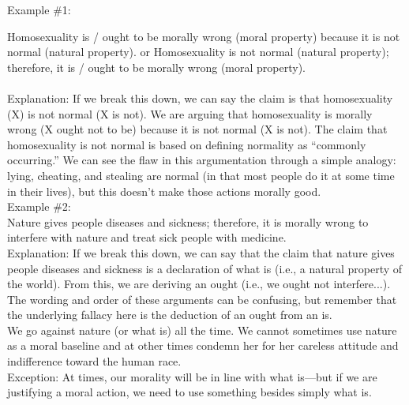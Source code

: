 \documentclass[a4paper,12pt,single,pdftex]{scrartcl}
\begin{document}
{      Example \#1:
    
    
       
    
    
      Homosexuality is / ought to be morally wrong (moral property) because it is not normal (natural property). \newline
or \newline
Homosexuality is not normal (natural property); therefore, it is / ought to be morally wrong (moral property).
    \\

    
       
    \\

    
      
        Explanation: If we break this down, we can say the claim is that homosexuality (X) is not normal (X is not). We are arguing that homosexuality is morally wrong (X ought not to be) because it is not normal (X is not). The claim that homosexuality is not normal is based on defining normality as “commonly occurring.” We can see the flaw in this argumentation through a simple analogy: lying, cheating, and stealing are normal (in that most people do it at some time in their lives), but this doesn’t make those actions morally good.
      \\

      
        Example \#2:
      \\

      
        Nature gives people diseases and sickness; therefore, it is morally wrong to interfere with nature and treat sick people with medicine.
      \\

      
        Explanation: If we break this down, we can say that the claim that nature gives people diseases and sickness is a declaration of what is (i.e., a natural property of the world). From this, we are deriving an ought (i.e., we ought not interfere...). The wording and order of these arguments can be confusing, but remember that the underlying fallacy here is the deduction of an ought from an is.
      \\

      
        We go against nature (or what is) all the time. We cannot sometimes use nature as a moral baseline and at other times condemn her for her careless attitude and indifference toward the human race.
      \\

      
        Exception: At times, our morality will be in line with what is—but if we are justifying a moral action, we need to use something besides simply what is.
      \\

}
\end{document}
